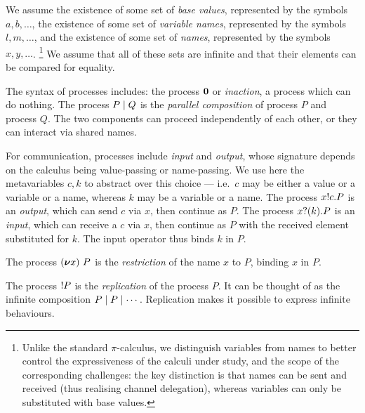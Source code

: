 \documentclass[runningheads]{llncs}
\begin{document}
We assume the existence of some set of \emph{base values}, represented by the symbols
\( a, b, \dots \), the existence of some set
of \emph{variable names}, represented by the symbols
\( l, m, \dots \), and the existence of some set of \emph{names},
represented by the symbols \( x, y, \dots \).%
\footnote{%
  Unlike the standard $\pi$-calculus, we distinguish variables from names to
  better control the expressiveness of the calculi under study, and the scope of
  the corresponding challenges: the key distinction is that names can be sent
  and received (thus realising channel delegation), whereas variables can only
  be substituted with base values.%
} %
%
We assume that all of these sets are infinite and that their elements can be
compared for equality.

The syntax of processes includes:
the process \( \bm{0} \) or \emph{inaction}, a process which can do nothing. The process \( P \mid Q \) is the \emph{parallel composition} of process \( P \) and process \( Q \).
The two components can proceed independently of each other, or they can interact via shared names.

For communication, processes include \emph{input} and \emph{output}, whose
signature depends on the calculus being value-passing or name-passing.
We use here the metavariables $c,k$ to abstract over this choice
--- i.e.~$c$ may be either a value or a variable or a name, whereas $k$ may
be a variable or a name.
The process \( x ! c . P \) is an \emph{output}, which can send
\( c \) via \( x \), then continue as \( P \).  %
The process \( x ? (k) . P \) is an \emph{input}, which can receive a $c$
via \( x \), then continue as \( P \) with the received element
substituted for \( k \).  The input operator thus
binds \( k \) in \( P \).

The process \( (\bm{\nu} x)~P \) is the \emph{restriction} of the name
\( x \) to \( P \), binding \( x \) in \( P \).


The process \( {!}P \) is the \emph{replication} of the process \( P \).
It can be thought of as the infinite composition \( P \mid P \mid \cdots \).
Replication makes it possible to express infinite behaviours.
\end{document}
